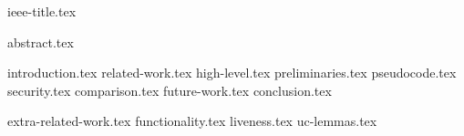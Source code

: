 \documentclass[conference,compsoc]{IEEEtran}
\begin{document}
{ieee-title.tex}
\maketitle
{abstract.tex}

{introduction.tex}
{related-work.tex}
{high-level.tex}
{preliminaries.tex}
{pseudocode.tex}
{security.tex}
{comparison.tex}
{future-work.tex}
{conclusion.tex}

\makeatletter%
%
  {\appendices}%
  {\appendix}%
\makeatother%
{extra-related-work.tex}
{functionality.tex}
{liveness.tex}
{uc-lemmas.tex}
\end{document}

